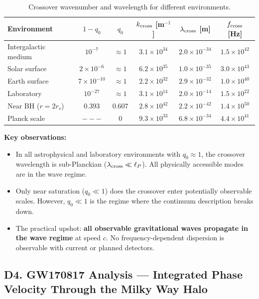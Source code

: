 \documentclass[reprint]{revtex4-2}
\begin{document}
\begin{table}[h]
\caption{Crossover wavenumber and wavelength for different environments.}
\label{tab:kcross}
\begin{tabular}{lccccc}
\toprule
Environment & $1-q_0$ & $q_0$ & $k_{\rm cross}$ [m$^{-1}$] & $\lambda_{\rm cross}$ [m] & $f_{\rm cross}$ [Hz] \\
\midrule
Intergalactic medium & $10^{-7}$ & $\approx 1$ & $3.1\times 10^{34}$ & $2.0\times 10^{-34}$ & $1.5\times 10^{42}$ \\
Solar surface & $2\times 10^{-6}$ & $\approx 1$ & $6.2\times 10^{35}$ & $1.0\times 10^{-35}$ & $3.0\times 10^{43}$ \\
Earth surface & $7\times 10^{-10}$ & $\approx 1$ & $2.2\times 10^{32}$ & $2.9\times 10^{-32}$ & $1.0\times 10^{40}$ \\
Laboratory & $10^{-27}$ & $\approx 1$ & $3.1\times 10^{14}$ & $2.0\times 10^{-14}$ & $1.5\times 10^{22}$ \\
Near BH ($r=2r_s$) & $0.393$ & $0.607$ & $2.8\times 10^{42}$ & $2.2\times 10^{-42}$ & $1.4\times 10^{50}$ \\
Planck scale & $---$ & $0$ & $9.3\times 10^{33}$ & $6.8\times 10^{-34}$ & $4.4\times 10^{41}$ \\
\bottomrule
\end{tabular}
\end{table}

\textbf{Key observations:}
\begin{itemize}
\item In all astrophysical and laboratory environments with $q_0\approx 1$, the crossover wavelength is sub-Planckian ($\lambda_{\rm cross} \ll \ell_P$). All physically accessible modes are in the wave regime.
\item Only near saturation ($q_0 \ll 1$) does the crossover enter potentially observable scales. However, $q_0 \ll 1$ is the regime where the continuum description breaks down.
\item The practical upshot: \textbf{all observable gravitational waves propagate in the wave regime} at speed $c$. No frequency-dependent dispersion is observable with current or planned detectors.
\end{itemize}

\subsection{D4. GW170817 Analysis --- Integrated Phase Velocity Through the Milky Way Halo}
\end{document}
